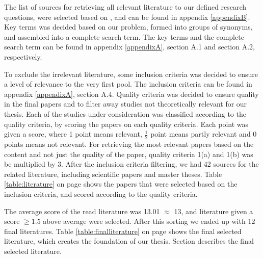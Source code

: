 The list of sources for retrieving all relevant literature to our defined research questions, were selected based on \citep[p.3]{kofod2014}, and can be found in appendix \ref{appendixB}. Key terms was decided based on our problem, formed into groups of synonyms, and assembled into a complete search term. The key terms and the complete search term can be found in appendix \ref{appendixA}, section A.1 and section A.2, respectively.

To exclude the irrelevant literature, some inclusion criteria was decided to ensure a level of relevance to the very first pool. The inclusion criteria can be found in appendix \ref{appendixA}, section A.4. Quality criteria was decided to ensure quality in the final papers and to filter away studies not theoretically relevant for our thesis. Each of the studies under consideration was classified according to the quality criteria, by scoring the papers on each quality criteria. Each point was given a score, where 1 point means relevant, $\frac{1}{2}$ point means partly relevant and 0 points means not relevant. For retrieving the most relevant papers based on the content and not just the quality of the paper, quality criteria 1(a) and 1(b) was be multiplied by 3. After the inclusion criteria filtering, we had 42 sources for the related literature, including scientific papers and master theses. Table \ref{table:literature} on page \pageref{table:literature} shows the papers that were selected based on the inclusion criteria, and scored according to the quality criteria. 

The average score of the read literature was 13.01 $\approx$ 13, and literature given a score $\geq{1.5}$ above average were selected. After this sorting we ended up with 12 final literatures. Table \ref{table:finalliterature} on page \pageref{table:finalliterature} shows the final selected literature, which creates the foundation of our thesis. Section describes the final selected literature.
